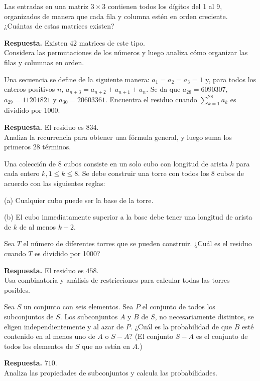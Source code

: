 \documentclass[11pt]{scrartcl}
\begin{document}
\begin{problem}[AMC 2010]
Las entradas en una matriz \(3 \times 3\) contienen todos los dígitos del 1 al 9, organizados de manera que cada fila y columna estén en orden creciente. ¿Cuántas de estas matrices existen?
\begin{hint}
\textbf{Respuesta.} Existen \( 42 \) matrices de este tipo.\\
Considera las permutaciones de los números y luego analiza cómo organizar las filas y columnas en orden.
\end{hint}
\end{problem}

\begin{problem}[AIME 2004]
Una secuencia se define de la siguiente manera: \( a_1 = a_2 = a_3 = 1 \) y, para todos los enteros positivos \( n \), \( a_{n+3} = a_{n+2} + a_{n+1} + a_n \). Se da que \( a_{28} = 6090307 \), \( a_{29} = 11201821 \) y \( a_{30} = 20603361 \). Encuentra el residuo cuando \( \sum_{k=1}^{28} a_k \) es dividido por 1000.
\begin{hint}
\textbf{Respuesta.} El residuo es \( 834\). \\
Analiza la recurrencia para obtener una fórmula general, y luego suma los primeros 28 términos.
\end{hint}
\end{problem}

\begin{problem}[AIME 2006]
Una colección de 8 cubos consiste en un solo cubo con longitud de arista \( k \) para cada entero \( k, 1 \leq k \leq 8 \). Se debe construir una torre con todos los 8 cubos de acuerdo con las siguientes reglas:
   
(a) Cualquier cubo puede ser la base de la torre.

(b) El cubo inmediatamente superior a la base debe tener una longitud de arista de \( k \) de al menos \( k + 2 \).

Sea \( T \) el número de diferentes torres que se pueden construir. ¿Cuál es el residuo cuando \( T \) es dividido por 1000?
\begin{hint}
\textbf{Respuesta.} El residuo es \( 458 \).\\
Usa combinatoria y análisis de restricciones para calcular todas las torres posibles.
\end{hint}
\end{problem}

\begin{problem}[AIME 2007]
Sea \( S \) un conjunto con seis elementos. Sea \( P \) el conjunto de todos los subconjuntos de \( S \). Los subconjuntos \( A \) y \( B \) de \( S \), no necesariamente distintos, se eligen independientemente y al azar de \( P \). ¿Cuál es la probabilidad de que \( B \) esté contenido en al menos uno de \( A \) o \( S - A \)? (El conjunto \( S - A \) es el conjunto de todos los elementos de \( S \) que no están en \( A \).)
\begin{hint}
\textbf{Respuesta.} \( 710 \).\\
Analiza las propiedades de subconjuntos y calcula las probabilidades.
\end{hint}
\end{problem}
\end{document}
